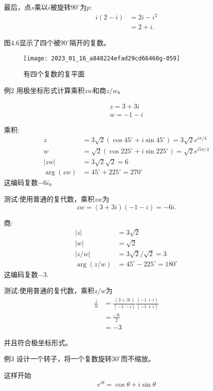 最后，点$s$乘以$i$被旋转$90^{\circ}$为$p$:
$$
\begin{aligned}
i(2-i) & =2 i-i^{2} \\
& =2+i .
\end{aligned}
$$

图$4.6$显示了四个被$90^{\circ}$隔开的复数。
\begin{figure}[h!]
    \centering
    \texttt{[image: 2023\_01\_16\_a848224efad29cd66460g-059]}
    \caption{有四个复数的复平面}
\end{figure}

例2  用极坐标形式计算乘积$ zw $和商$z / w$。

$$
\begin{gathered}
z=3+3 i \\
w=-1-i
\end{gathered}
$$

乘积:
$$
\begin{aligned}
z & =3 \sqrt{2}\left(\cos 45^{\circ}+i \sin 45^{\circ}\right)=3 \sqrt{2} e^{i \pi / 4} \\
w & =\sqrt{2}\left(\cos 225^{\circ}+i \sin 225^{\circ}\right)=\sqrt{2} e^{i 5 \pi / 4} \\
|z w| & =3 \sqrt{2} \sqrt{2}=6 \\
\arg (z w) & =45^{\circ}+225^{\circ}=270^{\circ}
\end{aligned}
$$
这编码复数$-6 i$。

测试:使用普通的复代数，乘积$ zw $为
$$
z w=(3+3 i)(-1-i)=-6 i .
$$

商:
$$
\begin{aligned}
|z| & =3 \sqrt{2} \\
|w| & =\sqrt{2} \\
|z / w| & =3 \sqrt{2} / \sqrt{2}=3 \\
\arg (z / w) & =45^{\circ}-225^{\circ}=180^{\circ}
\end{aligned}
$$
这编码复数$-3$.

测试:使用普通的复代数，乘积$ z/w $为
$$
\begin{aligned}
\frac{z}{w} & =\frac{(3+3 i)}{(-1-i)} \frac{(-1+i)}{(-1+i)} \\
& =\frac{-6}{2} \\
& =-3
\end{aligned}
$$

并且符合极坐标形式。

例3 设计一个转子，将一个复数旋转$30^{\circ}$而不缩放。


这样开始
$$
e^{i \theta}=\cos \theta+i \sin \theta
$$

